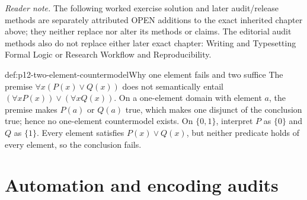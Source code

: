 \noindent\textit{Reader note.} The following worked exercise solution and later
audit/release methods are separately attributed OPEN additions to the exact
inherited chapter above; they neither replace nor alter its methods or claims.
The editorial audit methods also do not replace either later exact chapter:
Writing and Typesetting Formal Logic or Research Workflow and Reproducibility.

\begin{hbexample}{def:p12-two-element-countermodel}{Why one element fails and two suffice}
The premise \(\forall x(P(x)\lor Q(x))\) does not semantically entail
\((\forall xP(x))\lor(\forall xQ(x))\).  On a one-element domain with element
\(a\), the premise makes \(P(a)\) or \(Q(a)\) true, which makes one disjunct of
the conclusion true; hence no one-element countermodel exists.  On
\(\{0,1\}\), interpret \(P\) as \(\{0\}\) and \(Q\) as \(\{1\}\).  Every
element satisfies \(P(x)\lor Q(x)\), but neither predicate holds of every
element, so the conclusion fails.
\end{hbexample}


\section{Automation and encoding audits}

